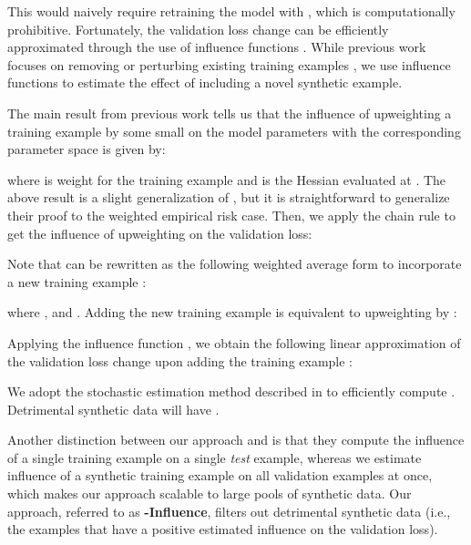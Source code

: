 \documentclass[11pt,a4paper]{article}
\newcommand{\gdaug}{}
\begin{document}
This would naively require retraining the model with , which is computationally prohibitive.
Fortunately, the validation loss change can be efficiently approximated through the use of influence functions \cite{Atkinson1983ResidualsAI,Koh2017UnderstandingBP}. While previous work focuses on removing or perturbing 
existing training examples \cite{Koh2017UnderstandingBP,Wang2018DataDO}, we use influence functions to estimate the effect of including a novel synthetic example.

The main result from previous work \citep{Atkinson1983ResidualsAI,Koh2017UnderstandingBP} tells us that the influence of upweighting a training example  by some small  on the model parameters  with the corresponding parameter space  is given by:

where  is weight for the training example  and  is the Hessian evaluated at . The above result is a slight generalization of \citet{Koh2017UnderstandingBP}, but it is straightforward to generalize their proof to the weighted empirical risk case. Then, we apply the chain rule to get the influence of upweighting  on the validation loss:

Note that  can be rewritten as the following weighted average form to incorporate a new training example :

 where ,  and . 
Adding the new training example  is equivalent to upweighting  by :


Applying the influence function , we obtain the following linear approximation of the validation loss change upon adding the training example :

We adopt the stochastic estimation method described in \citet{Koh2017UnderstandingBP} to efficiently compute . Detrimental synthetic data will have . 



Another distinction between our approach and \citet{Koh2017UnderstandingBP} is that they compute the influence of a single training example on a single \textit{test} example, whereas
we estimate influence of a synthetic training example on all validation examples at once, which makes our approach scalable to large pools of synthetic data.
Our approach, referred to as \textbf{\gdaug-Influence}, filters out detrimental synthetic data (i.e., the examples that have a positive estimated influence on the validation loss). 
\end{document}
